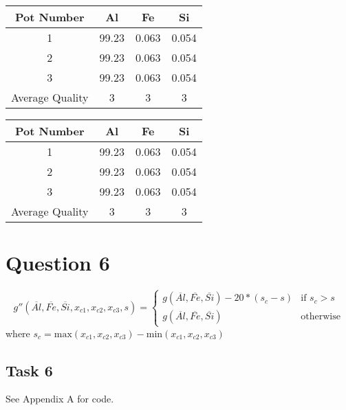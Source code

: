 \documentclass{article}
\begin{document}
\begin{table}
\centering
\begin{tabular}{ |c|c|c|c| }
  \hline
  Pot Number & Al & Fe & Si\\
  \hline
  1 & 99.23 & 0.063 & 0.054\\
  \hline
  2 & 99.23 & 0.063 & 0.054\\
  \hline
  3 & 99.23 & 0.063 & 0.054\\
  \hline
  Average Quality & 3 & 3 & 3\\
  \hline
\end{tabular}
  \label{tab:Crucible from x}
\end{table}

\begin{table}
\centering
\begin{tabular}{ |c|c|c|c| }
  \hline
  Pot Number & Al & Fe & Si\\
  \hline
  1 & 99.23 & 0.063 & 0.054\\
  \hline
  2 & 99.23 & 0.063 & 0.054\\
  \hline
  3 & 99.23 & 0.063 & 0.054\\
  \hline
  Average Quality & 3 & 3 & 3\\
  \hline
\end{tabular}
  \label{tab:Crucible from y}
\end{table}




\section{Question 6}
$$g''(\overline{Al}, \overline{Fe}, \overline{Si}, x_{c1}, x_{c2}, 
x_{c3}, s) =
\begin{cases}
    g(\overline{Al}, \overline{Fe}, \overline{Si}) - 20*(s_c - s) & \text{if } s_c > s \\
    g(\overline{Al}, \overline{Fe}, \overline{Si}) & \text{otherwise}
\end{cases}$$ where
$s_c = \text{max}(x_{c1}, x_{c2}, x_{c3}) - \text{min}(x_{c1}, x_{c2}, x_{c3})$


\subsection{Task 6}
See Appendix A for code.
\end{document}
